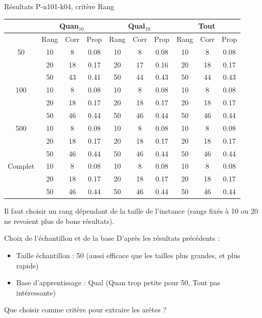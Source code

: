 \documentclass{beamer}
\begin{document}
\begin{frame}{Résultats P-n101-k04, critère Rang}
\begin{table}[H]

\begin{tabular}{|@{}c@{}|@{}c@{}|@{}c@{}|@{}c@{}||@{}c@{}|@{}c@{}|@{}c@{}||@{}c@{}|@{}c@{}|@{}c@{}|}

\hline
 & \multicolumn{3}{c|}{Quan$_{10}$} & \multicolumn{3}{c|}{Qual$_{10}$} & \multicolumn{3}{c|}{Tout} \\
 \hline
 & Rang & Corr & Prop & Rang & Corr & Prop & Rang & Corr & Prop \\
 \hline
 50 & 10  & 8 & 0.08 & 10  & 8 & 0.08 & 10  & 8 & 0.08 \\
 \cline{2-10} 
    & 20 & 18 & 0.17 & 20  & 17 & 0.16 & 20 & 18 & 0.17  \\
 \cline{2-10} 
    & 50 & 43 & 0.41 & 50 & 44 & 0.43 & 50 & 44 & 0.43  \\
  \hline
   100 & 10  & 8 & 0.08 & 10  & 8 & 0.08 & 10  & 8 & 0.08  \\
 \cline{2-10} 
    & 20 & 18 & 0.17 & 20 & 18 & 0.17 & 20 & 18 & 0.17  \\
  \cline{2-10} 
    & 50 & 46 & 0.44 & 50 & 46 & 0.44 & 50 & 46 & 0.44  \\
  \hline
   500 & 10  & 8 & 0.08 & 10  & 8 & 0.08 & 10  & 8 & 0.08  \\
 \cline{2-10} 
    & 20 & 18 & 0.17 & 20 & 18 & 0.17 & 20 & 18 & 0.17  \\
  \cline{2-10} 
    & 50 & 46 & 0.44 & 50 & 46 & 0.44 & 50 & 46 & 0.44  \\
  \hline
   Complet & 10  & 8 & 0.08 & 10  & 8 & 0.08 & 10  & 8 & 0.08  \\
 \cline{2-10} 
    & 20 & 18 & 0.17 & 20 & 18 & 0.17 & 20 & 18 & 0.17  \\
  \cline{2-10} 
    & 50 & 46 & 0.44 & 50 & 46 & 0.44 & 50 & 46 & 0.44  \\
  \hline

\end{tabular}
\end{table}
Il faut choisir un rang dépendant de la taille de l'instance (rangs fixés à 10 ou 20 ne revoient plus de bons résultats).
\end{frame}

\begin{frame}{Choix de l'échantillon et de la base}
D'après les résultats précédents :
\begin{itemize}
\item Taille échantillon : 50 (aussi efficace que les tailles plus grandes, et plus rapide)
\item Base d'apprentissage : Qual (Quan trop petite pour 50, Tout pas intéressante)
\end{itemize}
Que choisir comme critère pour extraire les arêtes ?
\end{frame}
\end{document}

